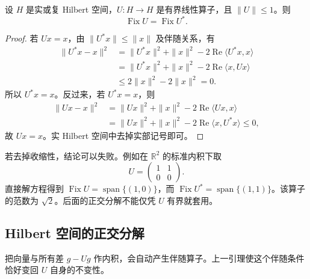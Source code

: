 \begin{lemma}[收缩算子及其伴随的不动向量]\label{b1:lem:contraction-fixed-adjoint-32}
设 \(H\) 是实或复 Hilbert 空间，\(U\colon H\rightarrow H\) 是有界线性算子，且 \(\|U\|\leq1\)。则
\[
 \operatorname{Fix}U=\operatorname{Fix}U^*.
\]
\end{lemma}
\begin{proof}
若 \(Ux=x\)，由 \(\|U^*x\|\leq\|x\|\) 及伴随关系，有
\[
 \begin{aligned}
 \|U^*x-x\|^2
 &=\|U^*x\|^2+\|x\|^2-2\operatorname{Re}\langle U^*x,x\rangle\\
 &=\|U^*x\|^2+\|x\|^2-2\operatorname{Re}\langle x,Ux\rangle\\
 &\leq2\|x\|^2-2\|x\|^2=0.
 \end{aligned}
\]
所以 \(U^*x=x\)。反过来，若 \(U^*x=x\)，则
\[
 \begin{aligned}
 \|Ux-x\|^2
 &=\|Ux\|^2+\|x\|^2-2\operatorname{Re}\langle Ux,x\rangle\\
 &=\|Ux\|^2+\|x\|^2-2\operatorname{Re}\langle x,U^*x\rangle
 \leq0,
 \end{aligned}
\]
故 \(Ux=x\)。实 Hilbert 空间中去掉实部记号即可。
\end{proof}

若去掉收缩性，结论可以失败。例如在 \(\mathbb R^2\) 的标准内积下取
\[
 U=\begin{pmatrix}1&1\\0&0\end{pmatrix}.
\]
直接解方程得到 \(\operatorname{Fix}U=\operatorname{span}\{(1,0)\}\)，而 \(\operatorname{Fix}U^*=\operatorname{span}\{(1,1)\}\)。该算子的范数为 \(\sqrt2\)。后面的正交分解不能仅凭 \(U\) 有界就套用。

\subsection{Hilbert 空间的正交分解}
\label{b1:subsec:320203}

把向量与所有差 \(g-Ug\) 作内积，会自动产生伴随算子。上一引理使这个伴随条件恰好变回 \(U\) 自身的不变性。

